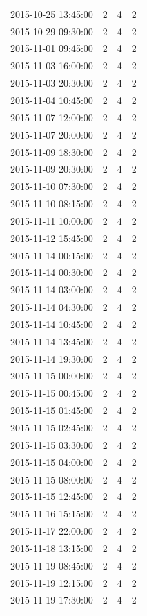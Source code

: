 \begin{tabular}{lrrr}
2015-10-25 13:45:00 & 2 & 4 & 2 \\
2015-10-29 09:30:00 & 2 & 4 & 2 \\
2015-11-01 09:45:00 & 2 & 4 & 2 \\
2015-11-03 16:00:00 & 2 & 4 & 2 \\
2015-11-03 20:30:00 & 2 & 4 & 2 \\
2015-11-04 10:45:00 & 2 & 4 & 2 \\
2015-11-07 12:00:00 & 2 & 4 & 2 \\
2015-11-07 20:00:00 & 2 & 4 & 2 \\
2015-11-09 18:30:00 & 2 & 4 & 2 \\
2015-11-09 20:30:00 & 2 & 4 & 2 \\
2015-11-10 07:30:00 & 2 & 4 & 2 \\
2015-11-10 08:15:00 & 2 & 4 & 2 \\
2015-11-11 10:00:00 & 2 & 4 & 2 \\
2015-11-12 15:45:00 & 2 & 4 & 2 \\
2015-11-14 00:15:00 & 2 & 4 & 2 \\
2015-11-14 00:30:00 & 2 & 4 & 2 \\
2015-11-14 03:00:00 & 2 & 4 & 2 \\
2015-11-14 04:30:00 & 2 & 4 & 2 \\
2015-11-14 10:45:00 & 2 & 4 & 2 \\
2015-11-14 13:45:00 & 2 & 4 & 2 \\
2015-11-14 19:30:00 & 2 & 4 & 2 \\
2015-11-15 00:00:00 & 2 & 4 & 2 \\
2015-11-15 00:45:00 & 2 & 4 & 2 \\
2015-11-15 01:45:00 & 2 & 4 & 2 \\
2015-11-15 02:45:00 & 2 & 4 & 2 \\
2015-11-15 03:30:00 & 2 & 4 & 2 \\
2015-11-15 04:00:00 & 2 & 4 & 2 \\
2015-11-15 08:00:00 & 2 & 4 & 2 \\
2015-11-15 12:45:00 & 2 & 4 & 2 \\
2015-11-16 15:15:00 & 2 & 4 & 2 \\
2015-11-17 22:00:00 & 2 & 4 & 2 \\
2015-11-18 13:15:00 & 2 & 4 & 2 \\
2015-11-19 08:45:00 & 2 & 4 & 2 \\
2015-11-19 12:15:00 & 2 & 4 & 2 \\
2015-11-19 17:30:00 & 2 & 4 & 2 \\

\end{tabular}
